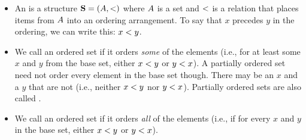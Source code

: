 \documentclass[../../../main.tex]{subfiles}
\begin{document}
\begin{itemize}

  \item An  is a structure $\struct{S} = (\set{A}, \strictorder/)$ where $A$ is a set and $\strictorder/$ is a relation that places items from $A$ into an ordering arrangement. To say that $x$ precedes $y$ in the ordering, we can write this: $x \strictorder/ y$.
  
  \item We call an ordered set  if it orders \emph{some} of the elements (i.e., for at least some $x$ and $y$ from the base set, either $x \strictorder/ y$ or $y \strictorder/ x$). A partially ordered set need not order every element in the base set though. There may be an $x$ and a $y$ that are not  (i.e., neither $x \strictorder/ y$ nor $y \strictorder/ x$). Partially ordered sets are also called .

  
  \item We call an ordered set  if it orders \emph{all} of the elements (i.e., if for every $x$ and $y$ in the base set, either $x \strictorder/ y$ or $y \strictorder/ x$). 
  
\end{itemize}
\end{document}
